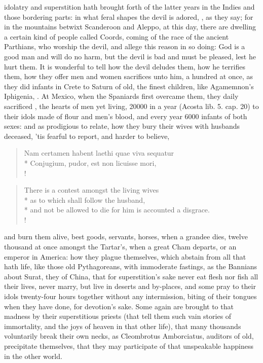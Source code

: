{idolatry and superstition hath brought forth of the latter years in the
Indies and those bordering parts: in what feral shapes the
devil is adored, , as they say; for in the
mountains betwixt Scanderoon and Aleppo, at this day, there are
dwelling a certain kind of people called Coords, coming of the race of
the ancient Parthians, who worship the devil, and allege this reason in
so doing: God is a good man and will do no harm, but the devil is bad
and must be pleased, lest he hurt them. It is wonderful to tell how the
devil deludes them, how he terrifies them, how they offer men and women
sacrifices unto him, a hundred at once, as they did infants in Crete to
Saturn of old, the finest children, like Agamemnon's Iphigenia, \etc{}. At
Mexico, when the Spaniards first overcame them, they daily
sacrificed , the
hearts of men yet living, 20\thinspace{}000 in a year (Acosta \textlatin{lib. 5. cap. 20}) to
their idols made of flour and men's blood, and every year 6000 infants
of both sexes: and as prodigious to relate, how they bury their
wives with husbands deceased, 'tis fearful to report, and harder to
believe,

\begin{latin}
\begin{verse}%
Nam certamen habent laethi quae viva sequatur\\*
Conjugium, pudor, est non licuisse mori,\\!
\end{verse}%
\end{latin}
\translationrule%
\begin{verse}%
There is a contest amongst the living wives\\*
as to which shall follow the husband,\\*
and not be allowed to die for him is accounted a disgrace.\\!
\end{verse}%

and burn them alive, best goods, servants, horses, when a grandee dies,
twelve thousand at once amongst the Tartar's, when a great Cham
departs, or an emperor in America: how they plague themselves, which
abstain from all that hath life, like those old Pythagoreans, with
immoderate fastings, as the Bannians about Surat, they of China,
that for superstition's sake never eat flesh nor fish all their lives,
never marry, but live in deserts and by-places, and some pray to their
idols twenty-four hours together without any intermission, biting of
their tongues when they have done, for devotion's sake. Some again are
brought to that madness by their superstitious priests (that tell them
such vain stories of immortality, and the joys of heaven in that other
life),  that many thousands voluntarily break their own necks, as
Cleombrotus Amborciatus, auditors of old, precipitate themselves, that
they may participate of that unspeakable happiness in the other world.

}
